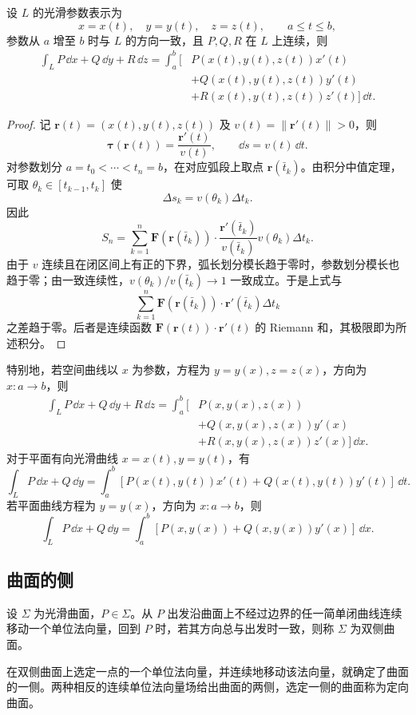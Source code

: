 \begin{theorem}
设 $L$ 的光滑参数表示为
\[
x=x(t),\quad y=y(t),\quad z=z(t),\qquad a\le t\le b,
\]
参数从 $a$ 增至 $b$ 时与 $L$ 的方向一致，且 $P,Q,R$ 在 $L$ 上连续，则
\begin{align*}
\int_LP\,\dd x+Q\,\dd y+R\,\dd z
=\int_a^b\bigl[&P(x(t),y(t),z(t))x'(t)\\
&+Q(x(t),y(t),z(t))y'(t)\\
&+R(x(t),y(t),z(t))z'(t)\bigr]\,\dd t.
\end{align*}
\end{theorem}
\begin{proof}
记 $\boldsymbol r(t)=(x(t),y(t),z(t))$ 及 $v(t)=\lVert\boldsymbol r'(t)\rVert>0$，则
\[
\boldsymbol\tau(\boldsymbol r(t))=\frac{\boldsymbol r'(t)}{v(t)},
\qquad \dd s=v(t)\,\dd t.
\]
对参数划分 $a=t_0<\cdots<t_n=b$，在对应弧段上取点 $\boldsymbol r(\bar t_k)$。由积分中值定理，可取 $\theta_k\in[t_{k-1},t_k]$ 使
\[
\Delta s_k=v(\theta_k)\Delta t_k.
\]
因此
\[
S_n=\sum_{k=1}^n
\boldsymbol F(\boldsymbol r(\bar t_k))\cdot
\frac{\boldsymbol r'(\bar t_k)}{v(\bar t_k)}
v(\theta_k)\Delta t_k.
\]
由于 $v$ 连续且在闭区间上有正的下界，弧长划分模长趋于零时，参数划分模长也趋于零；由一致连续性，$v(\theta_k)/v(\bar t_k)\to1$ 一致成立。于是上式与
\[
\sum_{k=1}^n\boldsymbol F(\boldsymbol r(\bar t_k))\cdot\boldsymbol r'(\bar t_k)\Delta t_k
\]
之差趋于零。后者是连续函数 $\boldsymbol F(\boldsymbol r(t))\cdot\boldsymbol r'(t)$ 的 Riemann 和，其极限即为所述积分。
\end{proof}

特别地，若空间曲线以 $x$ 为参数，方程为 $y=y(x),z=z(x)$，方向为 $x:a\to b$，则
\[
\begin{aligned}
\int_LP\,\dd x+Q\,\dd y+R\,\dd z
=\int_a^b\bigl[&P(x,y(x),z(x))\\
&+Q(x,y(x),z(x))y'(x)\\
&+R(x,y(x),z(x))z'(x)\bigr]\,\dd x.
\end{aligned}
\]
对于平面有向光滑曲线 $x=x(t),y=y(t)$，有
\[
\int_LP\,\dd x+Q\,\dd y
=\int_a^b[P(x(t),y(t))x'(t)+Q(x(t),y(t))y'(t)]\,\dd t.
\]
若平面曲线方程为 $y=y(x)$，方向为 $x:a\to b$，则
\[
\int_LP\,\dd x+Q\,\dd y
=\int_a^b[P(x,y(x))+Q(x,y(x))y'(x)]\,\dd x.
\]

\subsection*{曲面的侧}
\begin{definition}
设 $\Sigma$ 为光滑曲面，$P\in\Sigma$。从 $P$ 出发沿曲面上不经过边界的任一简单闭曲线连续移动一个单位法向量，回到 $P$ 时，若其方向总与出发时一致，则称 $\Sigma$ 为双侧曲面。
\end{definition}
在双侧曲面上选定一点的一个单位法向量，并连续地移动该法向量，就确定了曲面的一侧。两种相反的连续单位法向量场给出曲面的两侧，选定一侧的曲面称为定向曲面。

